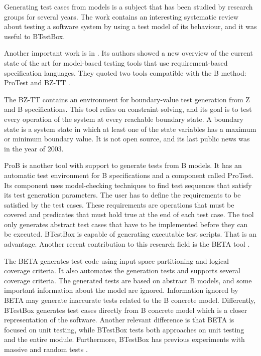 \documentclass[runningheads]{llncs}
\begin{document}
Generating test cases from models is a subject that has been studied by research groups for several years. The work \cite{shafique2010systematic} contains an interesting systematic review about testing a software system by using a test model of its behaviour, and it was useful to BTestBox.

Another important work is in \cite{marinescu:2015}. Its authors showed a new overview of the current state of the art for model-based testing tools that use requirement-based specification languages. They quoted two tools compatible with the B method: ProTest \cite{leuschel:2005} and BZ-TT \cite{bouquet:2002}.

The BZ-TT contains an environment for boundary-value test generation from Z and B specifications. This tool relies on constraint solving, and its goal is to test every operation of the system at every reachable boundary state. A boundary state is a system state in which at least one of the state variables has a maximum or minimum boundary value. It is not open source, and its last public news was in the year of 2003.

ProB is another tool with support to generate tests from B models. It has an automatic test environment for B specifications and a component called ProTest.
Its component uses model-checking techniques to find test sequences that satisfy its test generation parameters. The user has to define the requirements to be satisfied by the test cases. These requirements are operations that must be covered and predicates that must hold true at the end of each test case. The tool only generates abstract test cases that have to be implemented before they can be executed. BTestBox is capable of generating executable test scripts. That is an advantage. Another recent contribution to this research field is the BETA tool \cite{ernesto_thesis:2016}. 

The BETA generates test code using input space partitioning and logical coverage criteria. It also automates the generation tests and supports several coverage criteria. The generated tests are based on abstract B models, and some important information about the model are ignored.
Information ignored by BETA may generate inaccurate tests related to the B concrete model. Differently, BTestBox generates test cases directly from B concrete model which is a closer representation of the software.
Another relevant difference is that BETA is focused on unit testing, while BTestBox tests both approaches on unit testing and the entire module. Furthermore, BTestBox has previous experiments with massive and random tests \cite{deharbebtestbox}.
\end{document}
